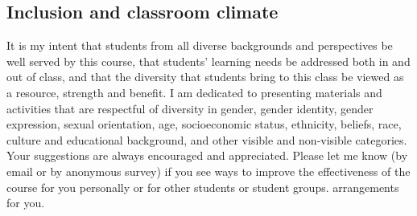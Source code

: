\documentclass[11pt]{article}
\begin{document}



\subsection{Inclusion and classroom climate}

It is my intent that students from all diverse backgrounds and perspectives be well served by this
course, that students' learning needs be addressed both in and out of class, and that the diversity
that students bring to this class be viewed as a resource, strength and benefit. I am dedicated
to presenting materials and activities that are respectful of diversity in gender, gender identity,
gender expression, sexual orientation, age, socioeconomic status, ethnicity, beliefs, race, culture
and educational background, and other visible and non-visible categories. Your suggestions are always encouraged and appreciated. Please let me know (by email or by anonymous survey) if you see ways to improve the effectiveness of the course for you personally or for other students or student groups. %
arrangements for you.
\end{document}
